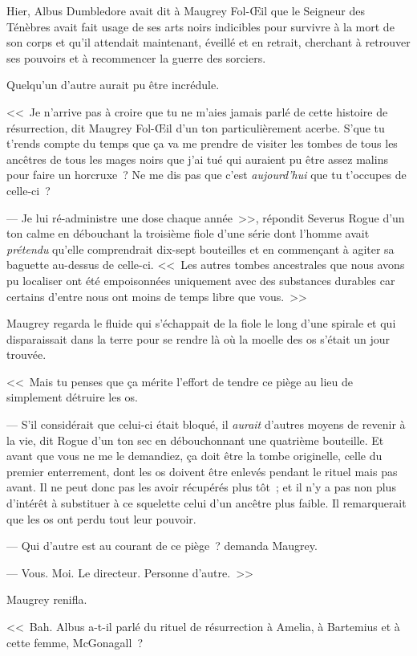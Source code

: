 Hier, Albus Dumbledore avait dit à Maugrey Fol-Œil que le Seigneur des Ténèbres avait fait usage de ses arts noirs indicibles pour survivre à la mort de son corps et qu'il attendait maintenant, éveillé et en retrait, cherchant à retrouver ses pouvoirs et à recommencer la guerre des sorciers.

Quelqu'un d'autre aurait pu être incrédule.

<<~Je n'arrive pas à croire que tu ne m'aies jamais parlé de cette histoire de résurrection, dit Maugrey Fol-Œil d'un ton particulièrement acerbe. S'que tu t'rends compte du temps que ça va me prendre de visiter les tombes de tous les ancêtres de tous les mages noirs que j'ai tué qui auraient pu être assez malins pour faire un horcruxe~? Ne me dis pas que c'est \emph{aujourd'hui} que tu t'occupes de celle-ci~?

--- Je lui ré-administre une dose chaque année~>>, répondit Severus Rogue d'un ton calme en débouchant la troisième fiole d'une série dont l'homme avait \emph{prétendu} qu'elle comprendrait dix-sept bouteilles et en commençant à agiter sa baguette au-dessus de celle-ci. <<~Les autres tombes ancestrales que nous avons pu localiser ont été empoisonnées uniquement avec des substances durables car certains d'entre nous ont moins de temps libre que vous.~>>

Maugrey regarda le fluide qui s'échappait de la fiole le long d'une spirale et qui disparaissait dans la terre pour se rendre là où la moelle des os s'était un jour trouvée.

<<~Mais tu penses que ça mérite l'effort de tendre ce piège au lieu de simplement détruire les os.

--- S'il considérait que celui-ci était bloqué, il \emph{aurait} d'autres moyens de revenir à la vie, dit Rogue d'un ton sec en débouchonnant une quatrième bouteille. Et avant que vous ne me le demandiez, ça doit être la tombe originelle, celle du premier enterrement, dont les os doivent être enlevés pendant le rituel mais pas avant. Il ne peut donc pas les avoir récupérés plus tôt~; et il n'y a pas non plus d'intérêt à substituer à ce squelette celui d'un ancêtre plus faible. Il remarquerait que les os ont perdu tout leur pouvoir.

--- Qui d'autre est au courant de ce piège~? demanda Maugrey.

--- Vous. Moi. Le directeur. Personne d'autre.~>>

Maugrey renifla.

<<~Bah. Albus a-t-il parlé du rituel de résurrection à Amelia, à Bartemius et à cette femme, McGonagall~?

